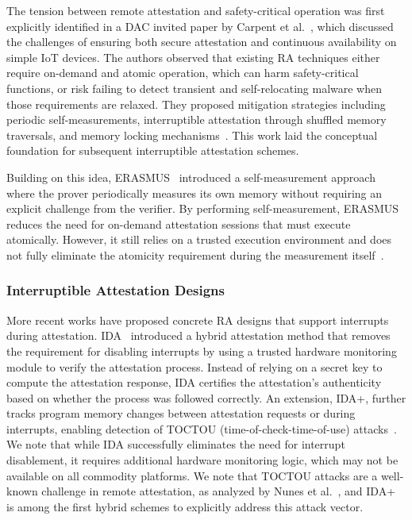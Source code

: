 \documentclass[a4paper,10pt]{article}
\begin{document}
The tension between remote attestation and safety-critical operation was first explicitly identified in a DAC invited paper by Carpent et al.~\cite{reconciling-ra}, which discussed the challenges of ensuring both secure attestation and continuous availability on simple IoT devices. The authors observed that existing RA techniques either require on-demand and atomic operation, which can harm safety-critical functions, or risk failing to detect transient and self-relocating malware when those requirements are relaxed. They proposed mitigation strategies including periodic self-measurements, interruptible attestation through shuffled memory traversals, and memory locking mechanisms~\cite{reconciling-ra}. This work laid the conceptual foundation for subsequent interruptible attestation schemes.

Building on this idea, ERASMUS~\cite{erasmus} introduced a self-measurement approach where the prover periodically measures its own memory without requiring an explicit challenge from the verifier. By performing self-measurement, ERASMUS reduces the need for on-demand attestation sessions that must execute atomically. However, it still relies on a trusted execution environment and does not fully eliminate the atomicity requirement during the measurement itself~\cite{erasmus}.

\subsubsection{Interruptible Attestation Designs}

More recent works have proposed concrete RA designs that support interrupts during attestation. IDA~\cite{ida2024} introduced a hybrid attestation method that removes the requirement for disabling interrupts by using a trusted hardware monitoring module to verify the attestation process. Instead of relying on a secret key to compute the attestation response, IDA certifies the attestation's authenticity based on whether the process was followed correctly. An extension, IDA+, further tracks program memory changes between attestation requests or during interrupts, enabling detection of TOCTOU (time-of-check-time-of-use) attacks~\cite{ida2024}. We note that while IDA successfully eliminates the need for interrupt disablement, it requires additional hardware monitoring logic, which may not be available on all commodity platforms. We
note that TOCTOU attacks are a well-known challenge in
remote attestation, as analyzed by Nunes et al.~\cite{nunes2021toctou},
and IDA+ is among the first hybrid schemes to explicitly
address this attack vector.
\end{document}
